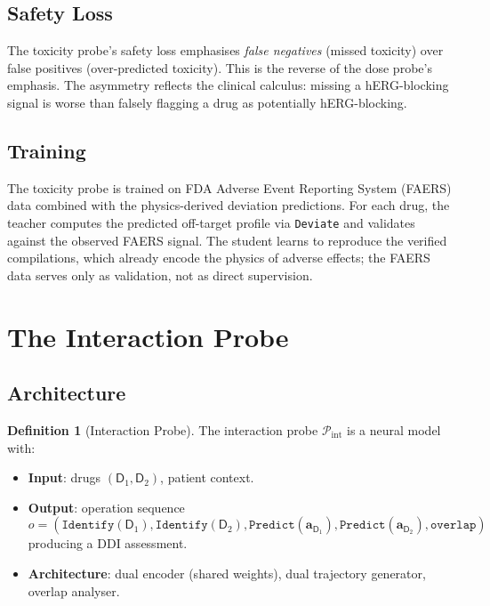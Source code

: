 \documentclass[11pt,twocolumn,a4paper]{article}
\theoremstyle{definition}
\newtheorem{definition}[theorem]{Definition}
\theoremstyle{remark}
\newcommand{\probe}{\mathcal{P}}
\newcommand{\drugaddr}{\mathbf{a}_{\mathsf{D}}}
\begin{document}
\subsection{Safety Loss}

The toxicity probe's safety loss emphasises \emph{false negatives} (missed toxicity) over false positives (over-predicted toxicity). This is the reverse of the dose probe's emphasis. The asymmetry reflects the clinical calculus: missing a hERG-blocking signal is worse than falsely flagging a drug as potentially hERG-blocking.

\subsection{Training}

The toxicity probe is trained on FDA Adverse Event Reporting System (FAERS) data combined with the physics-derived deviation predictions. For each drug, the teacher computes the predicted off-target profile via \texttt{Deviate} and validates against the observed FAERS signal. The student learns to reproduce the verified compilations, which already encode the physics of adverse effects; the FAERS data serves only as validation, not as direct supervision.

\section{The Interaction Probe}
\label{sec:interaction_probe}

\subsection{Architecture}

\begin{definition}[Interaction Probe]
\label{def:interaction_probe}
The interaction probe $\probe_{\mathrm{int}}$ is a neural model with:
\begin{itemize}[nosep,leftmargin=*]
\item \textbf{Input}: drugs $(\mathsf{D}_1, \mathsf{D}_2)$, patient context.
\item \textbf{Output}: operation sequence
\begin{equation*}
o = (\texttt{Identify}(\mathsf{D}_1), \texttt{Identify}(\mathsf{D}_2), \texttt{Predict}(\drugaddr_1), \texttt{Predict}(\drugaddr_2), \texttt{overlap})
\end{equation*}
producing a DDI assessment.
\item \textbf{Architecture}: dual encoder (shared weights), dual trajectory generator, overlap analyser.
\end{itemize}
\end{definition}
\end{document}
